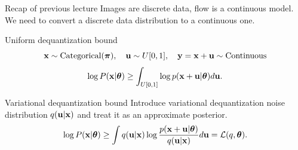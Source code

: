 
\usepackage{tikz}

\usetikzlibrary{arrows,shapes,positioning,shadows,trees}


\begin{frame}
\titlepage
\end{frame}
\begin{frame}{Recap of previous lecture}
	Images are discrete data, flow is a continuous model.
	We need to convert a discrete data distribution to a continuous one.
	
	\begin{block}{Uniform dequantization bound}
		\vspace{-0.5cm}
		\[
			\mathbf{x} \sim \text{Categorical}(\boldsymbol{\pi}), \quad 
			\mathbf{u} \sim U[0, 1], \quad 
			\mathbf{y} = \mathbf{x} + \mathbf{u} \sim \text{Continuous} 
		\]
		\vspace{-0.4cm}
		\[
			\log P(\mathbf{x} | \boldsymbol{\theta}) \geq \int_{U[0, 1]} \log p(\mathbf{x} + \mathbf{u} | \boldsymbol{\theta}) d \mathbf{u}.
		\]
	\end{block}
	\vspace{-0.2cm}
	\begin{block}{Variational dequantization bound}
		Introduce variational dequantization noise distribution $q(\mathbf{u} | \mathbf{x})$ and treat it as an approximate posterior. 
		\vspace{-0.2cm}
		\[
			\log P(\mathbf{x} | \boldsymbol{\theta}) \geq  \int q(\mathbf{u} | \mathbf{x}) \log \frac{p(\mathbf{x} + \mathbf{u} | \boldsymbol{\theta})}{q(\mathbf{u} | \mathbf{x})} d \mathbf{u} = \mathcal{L}(q, \boldsymbol{\theta}).
		\]
	\end{block}
\end{frame}
